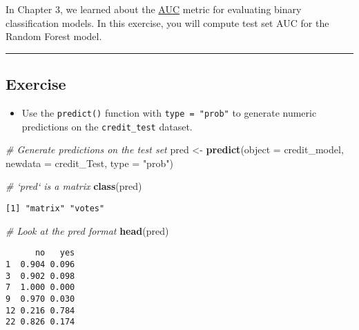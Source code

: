 \documentclass[
]{book}
\newenvironment{Shaded}{\begin{snugshade}}{\end{snugshade}}
\newcommand{\CommentTok}[1]{\textcolor[rgb]{0.56,0.35,0.01}{\textit{#1}}}
\newcommand{\DataTypeTok}[1]{\textcolor[rgb]{0.13,0.29,0.53}{#1}}
\newcommand{\KeywordTok}[1]{\textcolor[rgb]{0.13,0.29,0.53}{\textbf{#1}}}
\newcommand{\NormalTok}[1]{#1}
\newcommand{\StringTok}[1]{\textcolor[rgb]{0.31,0.60,0.02}{#1}}
\providecommand{\tightlist}{%
  \setlength{\itemsep}{0pt}\setlength{\parskip}{0pt}}
\begin{document}
In Chapter 3, we learned about the \href{https://en.wikipedia.org/wiki/Receiver_operating_characteristic\#Area_under_the_curve}{AUC} metric for evaluating binary classification models. In this exercise, you will compute test set AUC for the Random Forest model.

\begin{center}\rule{0.5\linewidth}{0.5pt}\end{center}

\hypertarget{exercise-19}{%
\subsection*{Exercise}\label{exercise-19}}

\begin{itemize}
\tightlist
\item
  Use the \texttt{predict()} function with \texttt{type\ =\ "prob"} to generate numeric predictions on the \texttt{credit\_test} dataset.
\end{itemize}

\begin{Shaded}
\begin{Highlighting}[]
\CommentTok{# Generate predictions on the test set}
\NormalTok{pred <-}\StringTok{ }\KeywordTok{predict}\NormalTok{(}\DataTypeTok{object =}\NormalTok{ credit_model, }
                \DataTypeTok{newdata =}\NormalTok{ credit_Test,}
                \DataTypeTok{type =} \StringTok{"prob"}\NormalTok{)}

\CommentTok{# `pred` is a matrix}
\KeywordTok{class}\NormalTok{(pred)}
\end{Highlighting}
\end{Shaded}

\begin{verbatim}
[1] "matrix" "votes" 
\end{verbatim}

\begin{Shaded}
\begin{Highlighting}[]
\CommentTok{# Look at the pred format}
\KeywordTok{head}\NormalTok{(pred) }
\end{Highlighting}
\end{Shaded}

\begin{verbatim}
      no   yes
1  0.904 0.096
3  0.902 0.098
7  1.000 0.000
9  0.970 0.030
12 0.216 0.784
22 0.826 0.174
\end{verbatim}
\end{document}
